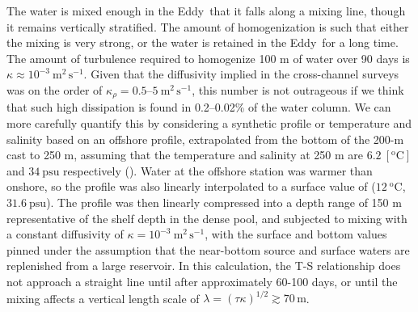 \documentclass[draft]{agujournal2019}
\newcommand*{\Eddy}{{\sc Eddy}}
\begin{document}
The water is  mixed enough in the \Eddy\ that it falls along a mixing line,
though it remains vertically stratified. The amount of homogenization is such
that either the mixing is very strong, or the water is retained in the \Eddy\
for a long time.  The amount of turbulence required to homogenize 100 m of
water over 90 days is $\kappa \approx 10^{-3}\ \mathrm{m^2\,s^{-1}}$.  Given
that the diffusivity implied in the cross-channel surveys was on the order of
$\kappa_{\rho} = 0.5$--$5\ \mathrm{m^2\,s^{-1}}$, this number is not outrageous
if we think that such high dissipation is found in 0.2--0.02\% of the water
column. We can more carefully quantify this by considering a synthetic profile
or temperature and salinity based on an offshore profile, extrapolated from the
bottom of the 200-m cast to 250 m, assuming that the temperature and salinity
at 250 m are $6.2\ \mathrm{[^oC]}$ and $34\ \mathrm{psu}$ respectively
(\fref{fig:TSExercise}).  Water at the offshore station was warmer than
onshore, so the profile was also linearly interpolated to a surface value of
($12\ \mathrm{^oC}$, $31.6\ \mathrm{psu}$).  The profile was then linearly
compressed into a depth range of 150 m representative of the shelf depth in the
dense pool, and subjected to mixing with a constant diffusivity of $\kappa =
10^{-3}\ \mathrm{m^2\,s^{-1}}$, with the surface and bottom values pinned under
the assumption that the near-bottom source and surface waters are replenished
from a large reservoir.  In this calculation, the T-S relationship does not
approach a straight line until after approximately 60-100 days, or until the
mixing affects a vertical length scale of $\lambda = \left(\tau
\kappa\right)^{1/2} \gtrsim 70\,\mathrm{m}$.
\end{document}
